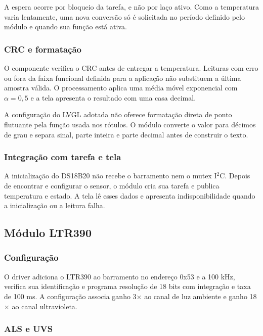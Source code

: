 \documentclass[a4paper,12pt]{article}
\begin{document}
A espera ocorre por bloqueio da tarefa, e n\~ao por la\c{c}o ativo. Como a temperatura varia lentamente, uma nova convers\~ao s\'o \'e solicitada no per\'iodo definido pelo m\'odulo e quando sua fun\c{c}\~ao est\'a ativa.


\subsubsection{CRC e formata\c{c}\~ao}


O componente verifica o CRC antes de entregar a temperatura. Leituras com erro ou fora da faixa funcional definida para a aplica\c{c}\~ao n\~ao substituem a \'ultima amostra v\'alida. O processamento aplica uma m\'edia m\'ovel exponencial com $\alpha=0{,}5$ e a tela apresenta o resultado com uma casa decimal.


A configura\c{c}\~ao do LVGL adotada n\~ao oferece formata\c{c}\~ao direta de ponto flutuante pela fun\c{c}\~ao usada nos r\'otulos. O m\'odulo converte o valor para d\'ecimos de grau e separa sinal, parte inteira e parte decimal antes de construir o texto.


\subsubsection{Integra\c{c}\~ao com tarefa e tela}


A inicializa\c{c}\~ao do DS18B20 n\~ao recebe o barramento nem o mutex I$^2$C. Depois de encontrar e configurar o sensor, o m\'odulo cria sua tarefa e publica temperatura e estado. A tela l\^e esses dados e apresenta indisponibilidade quando a inicializa\c{c}\~ao ou a leitura falha.


\subsection{M\'odulo LTR390}


\subsubsection{Configura\c{c}\~ao}


O driver adiciona o LTR390 ao barramento no endere\c{c}o 0x53 e a 100 kHz, verifica sua identifica\c{c}\~ao e programa resolu\c{c}\~ao de 18 bits com integra\c{c}\~ao e taxa de 100 ms. A configura\c{c}\~ao associa ganho 3$\times$ ao canal de luz ambiente e ganho 18$\times$ ao canal ultravioleta.


\subsubsection{ALS e UVS}
\end{document}
